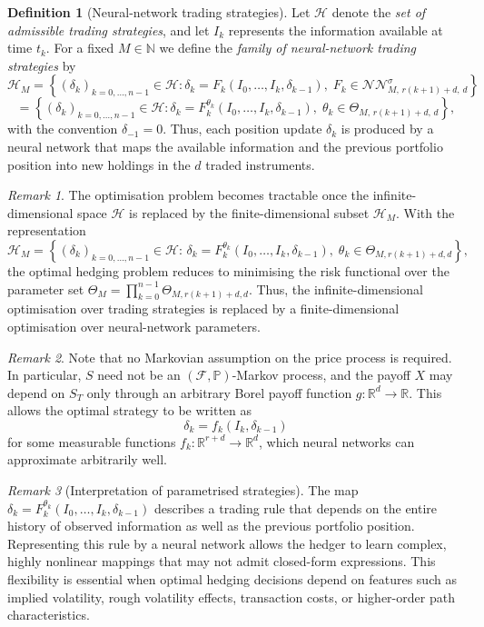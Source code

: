 \documentclass[12pt,a4paper]{article}
\theoremstyle{definition}
\newtheorem{definition}{Definition}[section]
\theoremstyle{plain}
\theoremstyle{remark}
\newtheorem{remark}{Remark}[section]
\theoremstyle{plain}
\begin{document}
\begin{definition}[Neural-network trading strategies]
\label{def:NN_trading_strategies_new}
Let $\mathcal{H}$ denote the \emph{set of admissible trading strategies}, and let 
$I_k$ represents the information available at time $t_k$.  
For a fixed $M \in \mathbb{N}$ we define the \emph{family of neural-network trading strategies} by
\[
\mathcal{H}_M
=
\left\{
    (\delta_k)_{k=0,\dots,n-1} \in \mathcal{H}
    :
    \delta_k = F_k(I_0,\dots,I_k,\delta_{k-1}),\;
    F_k \in \mathcal{NN}^{\sigma}_{M,\,r(k+1)+d,\,d}
\right\}
\]
\[
=
\left\{
    (\delta_k)_{k=0,\dots,n-1} \in \mathcal{H}
    :
    \delta_k = F_k^{\theta_k}(I_0,\dots,I_k,\delta_{k-1}),\;
    \theta_k \in \Theta_{M,\,r(k+1)+d,\,d}
\right\},
\]
with the convention $\delta_{-1}=0$.
Thus, each position update $\delta_k$ is produced by a neural network that maps the available information and the previous portfolio position into new holdings in the $d$ traded instruments.
\end{definition}
\begin{remark}\label{rem:nn_tractability}
The optimisation problem becomes tractable once the infinite-dimensional space $\mathcal{H}$ is replaced by the finite-dimensional subset $\mathcal{H}_M$. 
With the representation
\[
\mathcal{H}_M
=
\left\{
(\delta_k)_{k=0,\dots,n-1} \in \mathcal{H}
:\,
\delta_k = F_k^{\theta_k}(I_0,\dots,I_k,\delta_{k-1}),\;
\theta_k \in \Theta_{M,r(k+1)+d,d}
\right\},
\]
the optimal hedging problem reduces to minimising the risk functional over the parameter set $\Theta_M = \prod_{k=0}^{n-1} \Theta_{M,r(k+1)+d,d}$. 
Thus, the infinite-dimensional optimisation over trading strategies is replaced by a finite-dimensional optimisation over neural-network parameters.
\end{remark}

\begin{remark}\label{rem:no_markov_required}
Note that no Markovian assumption on the price process is required. 
In particular, $S$ need not be an $(\mathcal{F},\mathbb{P})$-Markov process, and the payoff $X$ may depend on $S_T$ only through an arbitrary Borel payoff function $g:\mathbb{R}^{d}\to\mathbb{R}$.  
This allows the optimal strategy to be written as
\[
\delta_k = f_k(I_k,\delta_{k-1})
\]
for some measurable functions $f_k : \mathbb{R}^{r+d} \to \mathbb{R}^{d}$, which neural networks can approximate arbitrarily well.
\end{remark}

\begin{remark}[Interpretation of parametrised strategies]\label{rem:parametrised_strategies}
The map $\delta_k = F^{\theta_k}_k(I_0,\dots,I_k,\delta_{k-1})$ describes a trading rule that depends on the entire history of observed information as well as the previous portfolio position. 
Representing this rule by a neural network allows the hedger to learn complex, highly nonlinear mappings that may not admit closed-form expressions. 
This flexibility is essential when optimal hedging decisions depend on features such as implied volatility, rough volatility effects, transaction costs, or higher-order path characteristics.
\end{remark}
\end{document}
